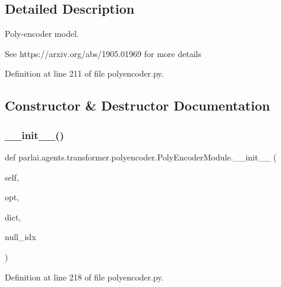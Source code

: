 \subsection{Detailed Description}
\begin{DoxyVerb}Poly-encoder model.

See https://arxiv.org/abs/1905.01969 for more details
\end{DoxyVerb}
 

Definition at line 211 of file polyencoder.\+py.



\subsection{Constructor \& Destructor Documentation}
\mbox{\label{classparlai_1_1agents_1_1transformer_1_1polyencoder_1_1PolyEncoderModule_acf6f1b0dd5025b20c330d08bd2a13755}} 
\subsubsection{\texorpdfstring{\+\_\+\+\_\+init\+\_\+\+\_\+()}{\_\_init\_\_()}}
{\footnotesize\ttfamily def parlai.\+agents.\+transformer.\+polyencoder.\+Poly\+Encoder\+Module.\+\_\+\+\_\+init\+\_\+\+\_\+ (\begin{DoxyParamCaption}\item[{}]{self,  }\item[{}]{opt,  }\item[{}]{dict,  }\item[{}]{null\+\_\+idx }\end{DoxyParamCaption})}



Definition at line 218 of file polyencoder.\+py.


